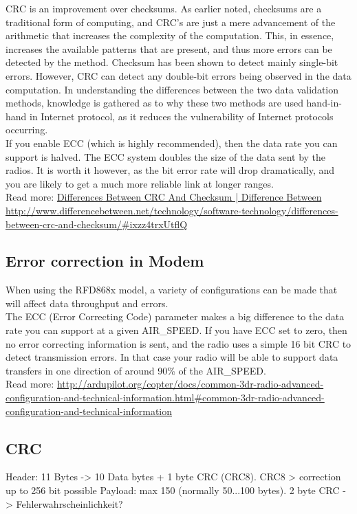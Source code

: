 CRC is an improvement over checksums. As earlier noted, checksums are a traditional form of computing, and CRC’s are just a mere advancement of the arithmetic that increases the complexity of the computation.  This, in essence, increases the available patterns that are present, and thus more errors can be detected by the method. Checksum has been shown to detect mainly single-bit errors. However, CRC can detect any double-bit errors being observed in the data computation. In understanding the differences between the two data validation methods, knowledge is gathered as to why these two methods are used hand-in-hand in Internet protocol, as it reduces the vulnerability of Internet protocols occurring.\\
If you enable ECC (which is highly recommended), then the data rate you can support is halved. The ECC system doubles the size of the data sent by the radios. It is worth it however, as the bit error rate will drop dramatically, and you are likely to get a much more reliable link at longer ranges.\\
Read more: \url{Differences Between CRC And Checksum | Difference Between http://www.differencebetween.net/technology/software-technology/differences-between-crc-and-checksum/#ixzz4trxUtflQ} \\

\subsection*{Error correction in Modem}
When using the RFD868x model, a variety of configurations can be made that will affect data throughput and errors.\\
The ECC (Error Correcting Code) parameter makes a big difference to the data rate you can support at a given AIR\_SPEED. If you have ECC set to zero, then no error correcting information is sent, and the radio uses a simple 16 bit CRC to detect transmission errors. In that case your radio will be able to support data transfers in one direction of around 90\% of the AIR\_SPEED.\\
Read more: \url{http://ardupilot.org/copter/docs/common-3dr-radio-advanced-configuration-and-technical-information.html#common-3dr-radio-advanced-configuration-and-technical-information}

\subsection*{CRC}
Header: 11 Bytes -> 10 Data bytes + 1 byte CRC (CRC8). CRC8 > correction up to 256 bit possible
Payload: max 150 (normally 50...100 bytes). 2 byte CRC -> Fehlerwahrscheinlichkeit?